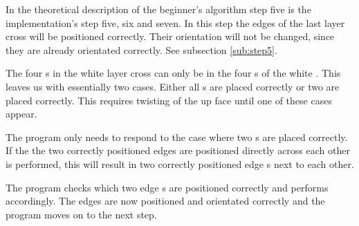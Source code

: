 In the theoretical description of the beginner's algorithm step five is the implementation's step five, six and seven. 
In this step the edges of the last layer cross will be positioned correctly. Their orientation will not be changed, since they are already orientated correctly. See subsection \ref{sub:step5}.

The four \cpiece{}s in the white layer cross can only be in the four \cubicle{}s of the white \face{}. This leaves us with essentially two cases. Either all \cpiece{}s are placed correctly or two are placed correctly. This requires twisting of the up face until one of these cases appear.

The program only needs to respond to the case where two \cpiece{}s are placed correctly. 
If the the two correctly positioned edges are positioned directly across each other  is performed, this will result in two correctly positioned edge \cubie{}s next to each other.

The program checks which two edge \cpiece{}s are positioned correctly and performs  accordingly. 
The edges are now positioned and orientated correctly and the program moves on to the next step.